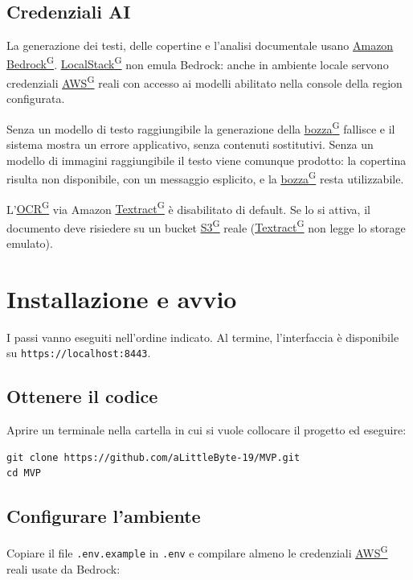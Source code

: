 \documentclass[a4paper,12pt]{article}
\providecommand{\glslink}[2]{\href{https://alittlebyte-19.github.io/Documentazione/glossario.html\#gls-#1}{\underline{#2}\textsuperscript{\scriptsize G}}}
\begin{document}
\subsection{Credenziali AI}

La generazione dei testi, delle copertine e l'analisi documentale usano \glslink{amazon-bedrock}{Amazon Bedrock}. \glslink{localstack}{LocalStack} non emula Bedrock: anche in ambiente locale servono credenziali \glslink{aws}{AWS} reali con accesso ai modelli abilitato nella console della region configurata.

Senza un modello di testo raggiungibile la generazione della \glslink{bozza-draft}{bozza} fallisce e il sistema mostra un errore applicativo, senza contenuti sostitutivi. Senza un modello di immagini raggiungibile il testo viene comunque prodotto: la copertina risulta non disponibile, con un messaggio esplicito, e la \glslink{bozza-draft}{bozza} resta utilizzabile.

L'\glslink{ocr-riconoscimento-ottico-dei-caratteri}{OCR} via Amazon \glslink{textract}{Textract} è disabilitato di default. Se lo si attiva, il documento deve risiedere su un bucket \glslink{s3-simple-storage-service}{S3} reale (\glslink{textract}{Textract} non legge lo storage emulato).

\section{Installazione e avvio}

I passi vanno eseguiti nell'ordine indicato. Al termine, l'interfaccia è disponibile su \texttt{https://localhost:8443}.

\subsection{Ottenere il codice}

Aprire un terminale nella cartella in cui si vuole collocare il progetto ed eseguire:

\begin{verbatim}
git clone https://github.com/aLittleByte-19/MVP.git
cd MVP
\end{verbatim}

\subsection{Configurare l'ambiente}

Copiare il file \texttt{.env.example} in \texttt{.env} e compilare almeno le credenziali \glslink{aws}{AWS} reali usate da Bedrock:
\end{document}
